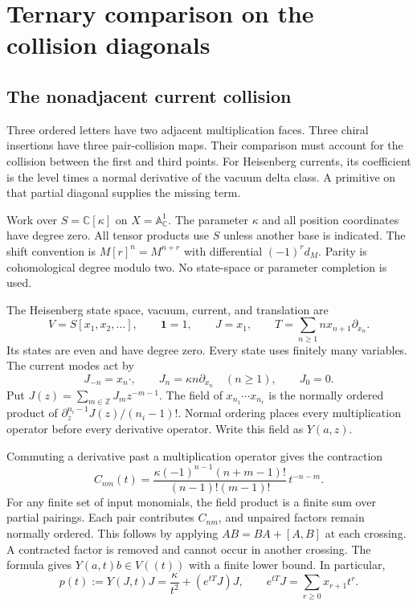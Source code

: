 \providecommand{\HH}{\mathcal H}
\providecommand{\pp}{\operatorname{pp}}
\chapter{Ternary comparison on the collision diagonals}
\label{chap:bd26-comparison}

\section{The nonadjacent current collision}

Three ordered letters have two adjacent multiplication faces.
Three chiral insertions have three pair-collision maps.
Their comparison must account for the collision between the first and third points.
For Heisenberg currents, its coefficient is the level times a normal derivative of the vacuum delta class.
A primitive on that partial diagonal supplies the missing term.

Work over $S=\mathbb C[\kappa]$ on $X=\mathbb A^1_{\mathbb C}$.
The parameter $\kappa$ and all position coordinates have degree zero.
All tensor products use $S$ unless another base is indicated.
The shift convention is $M[r]^n=M^{n+r}$ with differential $(-1)^r d_M$.
Parity is cohomological degree modulo two.
No state-space or parameter completion is used.

The Heisenberg state space, vacuum, current, and translation are
\[
 V=S[x_1,x_2,\ldots],\qquad \mathbf1=1,\qquad J=x_1,
 \qquad T=\sum_{n\geq1}n x_{n+1}\partial_{x_n}.
\]
Its states are even and have degree zero.
Every state uses finitely many variables.
The current modes act by
\[
 J_{-n}=x_n\cdot,\qquad J_n=\kappa n\partial_{x_n}\quad(n\geq1),
 \qquad J_0=0.
\]
Put $J(z)=\sum_{m\in\mathbb Z}J_mz^{-m-1}$.
The field of $x_{n_1}\cdots x_{n_r}$ is the normally ordered product of
$\partial_z^{n_i-1}J(z)/(n_i-1)!$.
Normal ordering places every multiplication operator before every derivative operator.
Write this field as $Y(a,z)$.

Commuting a derivative past a multiplication operator gives the contraction
\[
 C_{nm}(t)=
 \frac{\kappa(-1)^{n-1}(n+m-1)!}{(n-1)!(m-1)!}\,t^{-n-m}.
\]
For any finite set of input monomials, the field product is a finite sum over partial pairings.
Each pair contributes $C_{nm}$, and unpaired factors remain normally ordered.
This follows by applying $AB=BA+[A,B]$ at each crossing.
A contracted factor is removed and cannot occur in another crossing.
The formula gives $Y(a,t)b\in V((t))$ with a finite lower bound.
In particular,
\begin{equation}\label{eq:bd26-field}
 p(t):=Y(J,t)J=\frac\kappa{t^2}+(e^{tT}J)J,
 \qquad e^{tT}J=\sum_{r\geq0}x_{r+1}t^r.
\end{equation}


